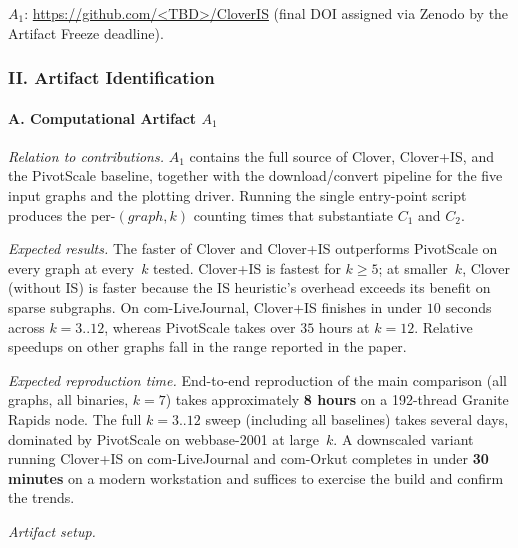 $A_1$: \url{https://github.com/<TBD>/CloverIS} (final DOI assigned via
Zenodo by the Artifact Freeze deadline).

\subsubsection*{II. Artifact Identification}

\paragraph{A. Computational Artifact $A_1$}

\noindent\emph{Relation to contributions.}
$A_1$ contains the full source of \textsf{Clover}, \textsf{Clover+IS}, and
the \textsf{PivotScale} baseline, together with the download/convert
pipeline for the five input graphs and the plotting driver. Running the
single entry-point script produces the per-$(graph, k)$ counting times
that substantiate $C_1$ and $C_2$.

\noindent\emph{Expected results.}
The faster of \textsf{Clover} and \textsf{Clover+IS} outperforms
\textsf{PivotScale} on every graph at every~$k$ tested.
\textsf{Clover+IS} is fastest for $k \geq 5$; at smaller~$k$,
\textsf{Clover} (without IS) is faster because the IS heuristic's
overhead exceeds its benefit on sparse subgraphs. On \textsf{com-LiveJournal}, \textsf{Clover+IS} finishes in under $10$ seconds
across $k = 3..12$, whereas \textsf{PivotScale} takes over $35$ hours at $k = 12$.
Relative speedups on other graphs fall in the range reported in the paper.

\noindent\emph{Expected reproduction time.}
End-to-end reproduction of the main comparison (all graphs, all binaries,
$k = 7$) takes approximately \textbf{8 hours} on a 192-thread Granite
Rapids node. The full $k = 3..12$ sweep (including all baselines) takes
several days, dominated by \textsf{PivotScale} on
\textsf{webbase-2001} at large~$k$. A downscaled variant running \textsf{Clover+IS} on
\textsf{com-LiveJournal} and \textsf{com-Orkut} completes in under
\textbf{30 minutes} on a modern workstation and suffices to exercise the
build and confirm the trends.

\noindent\emph{Artifact setup.}

